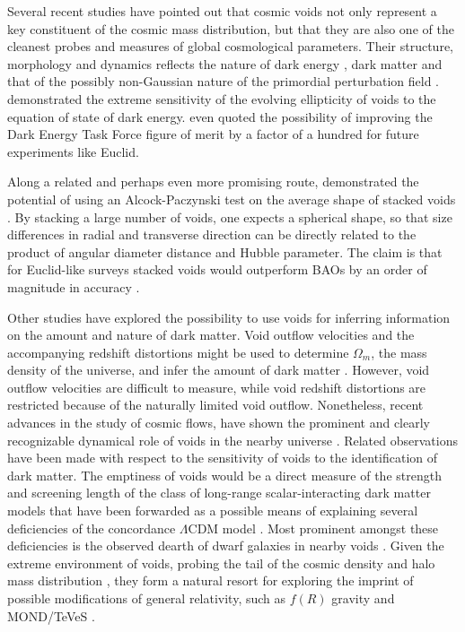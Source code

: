 Several recent studies have pointed out that cosmic voids 
not only represent a key constituent of the cosmic mass distribution, but that they are also one of the cleanest probes and 
measures of global cosmological parameters. Their structure, morphology and dynamics reflects the nature of dark energy 
\citep{parklee07, leepark09, lavaux10, biswas10, lavaux11, shoji12}, dark matter \citep{hellwing10, li11} and that of the 
possibly non-Gaussian nature of the primordial perturbation field \citep{kamionkowski09}. \citet{lavaux10} demonstrated the extreme 
sensitivity of the evolving ellipticity of voids to the equation of state of dark energy. \citet{biswas10} even quoted the 
possibility of improving the Dark Energy Task Force figure of merit by a factor of a hundred for future experiments like 
Euclid.

Along a related and perhaps even more promising route, \citet{lavaux11} demonstrated the potential of using an Alcock-Paczynski 
test on the average shape of stacked voids \citep[also see][]{shoji12}. By stacking a large number of voids, one expects a spherical 
shape, so that size differences in radial and transverse direction can be directly related to the product of angular diameter distance 
and Hubble parameter. The claim is that for Euclid-like surveys stacked voids would outperform BAOs by an order 
of magnitude in accuracy \citep{lavaux11}.

Other studies have explored the possibility to use voids for inferring information on the amount and nature of dark 
matter. Void outflow velocities and the accompanying redshift distortions might be used to determine $\Omega_m$, the 
mass density of the universe, and infer the amount of dark matter \citep{martel90, dekel94, ryden96}. However, void outflow 
velocities are difficult to measure, while void redshift distortions are restricted because of the naturally limited void outflow. 
Nonetheless, recent advances in the study of cosmic flows, have shown the prominent and clearly recognizable dynamical role of 
voids in the nearby universe \citep{courtois12, tully08}. Related observations have been made with respect to the sensitivity 
of voids to the identification of dark matter. The emptiness of voids would be a direct measure of the strength and screening length of 
the class of long-range scalar-interacting dark matter models that have been forwarded as a possible means of explaining several 
deficiencies of the concordance $\Lambda$CDM model \citep{farrar04, gubser04, nusser05, peebles10, hellwing10, li11}. Most 
prominent amongst these deficiencies is the observed dearth of dwarf galaxies in nearby voids \citep{peebles01}. Given the extreme 
environment of voids, probing the tail of the cosmic density and halo mass distribution \citep{platen12}, they form a natural 
resort for exploring the imprint of possible modifications of general relativity, such as $f(R)$ gravity \citep{li11} and 
MOND/TeVeS \citep{llinares11}. 

